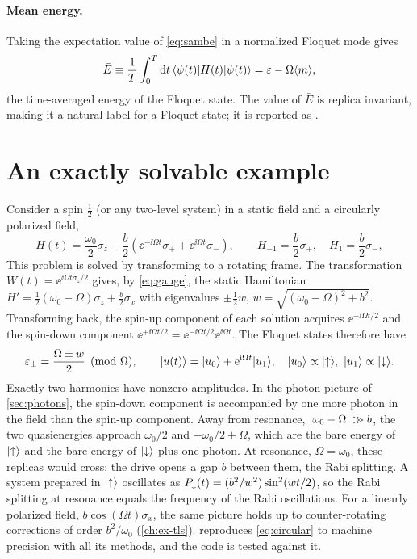 \paragraph{Mean energy.}
Taking the expectation value of \eqref{eq:sambe} in a normalized Floquet mode gives
\begin{equation}\label{eq:mean-energy}
  \bar E\equiv\frac1T\int_0^T\mathrm{d} t\,\langle \psi(t)\vert H(t)\vert \psi(t)\rangle=\varepsilon-\Omega\langle m\rangle ,
\end{equation}
the time-averaged energy of the Floquet state. The value of $\bar E$ is replica
invariant, making it a natural label for a Floquet state; it is reported as
.

\section{An exactly solvable example}\label{sec:circular}

Consider a spin $\tfrac12$ (or any two-level system) in a static field and a circularly
polarized field,
\begin{equation}
  H(t)=\frac{\omega_0}2\sigma_z+\frac b2\left(\ee^{-\ii\Omega t}\sigma_++\ee^{\ii\Omega t}\sigma_-\right),
  \qquad H_{-1}=\frac b2\sigma_+,\quad H_1=\frac b2\sigma_-,
\end{equation}
This problem is solved by transforming to a rotating frame. The transformation
$W(t)=\ee^{\ii\Omega t\sigma_z/2}$ gives, by \cref{eq:gauge}, the static Hamiltonian
$H'=\tfrac12(\omega_0-\Omega)\sigma_z+\tfrac b2\sigma_x$ with eigenvalues $\pm\tfrac12w$,
$w=\sqrt{(\omega_0-\Omega)^2+b^2}$. Transforming back, the spin-up component of each solution
acquires $\ee^{-\ii\Omega t/2}$ and the spin-down component $\ee^{+\ii\Omega
t/2}=\ee^{-\ii\Omega t/2}\ee^{\ii\Omega t}$. The Floquet states therefore have
\begin{equation}\label{eq:circular}
  \varepsilon_\pm=\frac{\Omega\pm w}2\pmod\Omega,\qquad
  \lvert u(t)\rangle=\lvert u_0\rangle+\mathrm{e}^{\mathrm{i}\Omega t}\lvert u_1\rangle,\quad \lvert u_0\rangle\propto\lvert {\uparrow}\rangle,\ \lvert u_1\rangle\propto\lvert {\downarrow}\rangle .
\end{equation}
Exactly two harmonics have nonzero amplitudes. In the photon picture of \cref{sec:photons}, the
spin-down component is accompanied by one more photon in the field than the spin-up
component. Away from resonance, $\lvert \omega_0-\Omega\rvert\gg b$, the two quasienergies
approach $\omega_0/2$ and $-\omega_0/2+\Omega$, which are the bare energy of $\lvert {\uparrow}\rangle$ and the
bare energy of $\lvert {\downarrow}\rangle$ plus one photon. At resonance, $\Omega=\omega_0$, these replicas
would cross; the drive opens a gap $b$ between them, the Rabi splitting. A system prepared in
$\lvert {\uparrow}\rangle$ oscillates as $P_{\downarrow}(t)=(b^2/w^2)\sin^2(wt/2)$, so the Rabi splitting at resonance
equals the frequency of the Rabi oscillations. For a linearly polarized field,
$b\cos(\Omega t)\sigma_x$, the same picture holds up to counter-rotating corrections of
order $b^2/\omega_0$ (\cref{ch:ex-tls}). \pkg{} reproduces \cref{eq:circular} to machine
precision with all its methods, and the code is tested against it.

